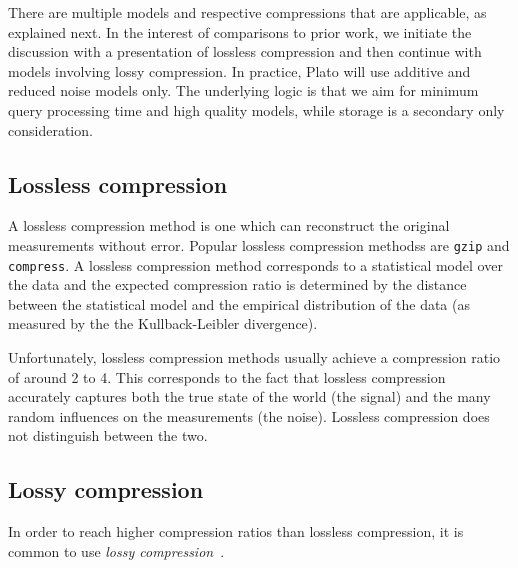 There are multiple models and respective compressions that are applicable, as explained next. In the interest of comparisons to prior work, we initiate the discussion with a presentation of lossless compression and then continue with models involving lossy compression. In practice, Plato will use additive and reduced noise models only. The underlying logic is that we aim for minimum query processing time and high quality models, while storage is a secondary only consideration.


\subsection{Lossless compression}
A lossless compression method is one which can reconstruct the
original measurements without error. Popular lossless compression
methodss are {\tt gzip} and {\tt compress}. A lossless compression
method corresponds to a statistical model over the data and the
expected compression ratio is determined by the distance between
the statistical model and the empirical distribution of the data (as
measured by the the Kullback-Leibler divergence). 

Unfortunately, lossless compression methods usually achieve a
compression ratio of around 2 to 4. This corresponds to the
fact that lossless compression accurately captures both the true state of the world (the signal)
and the many random influences on the measurements (the noise). 
Lossless compression does not distinguish between the two.

\newcommand{\vx}{\mathbf{x}}
\newcommand{\hx}{\hat{x}}
\newcommand{\vhx}{\hat{\mathbf{x}}}
\newcommand{\vc}{\mathbf{c}}
\newcommand{\vr}{\mathbf{r}}

\subsection{Lossy compression}
In order to reach higher compression ratios than lossless
compression, it is common to use {\em lossy compression}~\cite{CompressionBook}.

